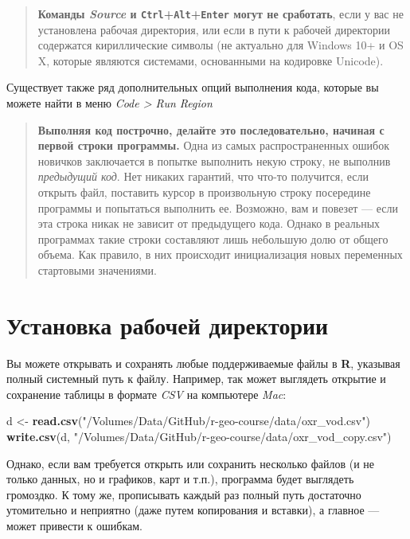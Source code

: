 \documentclass[]{book}
\newenvironment{Shaded}{\begin{snugshade}}{\end{snugshade}}
\newcommand{\KeywordTok}[1]{\textcolor[rgb]{0.13,0.29,0.53}{\textbf{#1}}}
\newcommand{\StringTok}[1]{\textcolor[rgb]{0.31,0.60,0.02}{#1}}
\newcommand{\NormalTok}[1]{#1}
\begin{document}
\begin{quote}
\textbf{Команды \emph{Source} и
\texttt{Ctrl}+\texttt{Alt}+\texttt{Enter} могут не сработать}, если у
вас не установлена рабочая директория, или если в пути к рабочей
директории содержатся кириллические символы (не актуально для Windows
10+ и OS X, которые являются системами, основанными на кодировке
Unicode).
\end{quote}

Существует также ряд дополнительных опций выполнения кода, которые вы
можете найти в меню \emph{Code \textgreater{} Run Region}

\begin{quote}
\textbf{Выполняя код построчно, делайте это последовательно, начиная с
первой строки программы.} Одна из самых распространенных ошибок новичков
заключается в попытке выполнить некую строку, не выполнив
\emph{предыдущий код}. Нет никаких гарантий, что что-то получится, если
открыть файл, поставить курсор в произвольную строку посередине
программы и попытаться выполнить ее. Возможно, вам и повезет --- если
эта строка никак не зависит от предыдущего кода. Однако в реальных
программах такие строки составляют лишь небольшую долю от общего объема.
Как правило, в них происходит инициализация новых переменных стартовыми
значениями.
\end{quote}

\section*{Установка рабочей директории}\label{--}

Вы можете открывать и сохранять любые поддерживаемые файлы в \textbf{R},
указывая полный системный путь к файлу. Например, так может выглядеть
открытие и сохранение таблицы в формате \emph{CSV} на компьютере
\emph{Mac}:

\begin{Shaded}
\begin{Highlighting}[]
\NormalTok{d <-}\StringTok{ }\KeywordTok{read.csv}\NormalTok{(}\StringTok{"/Volumes/Data/GitHub/r-geo-course/data/oxr_vod.csv"}\NormalTok{)}
\KeywordTok{write.csv}\NormalTok{(d, }\StringTok{"/Volumes/Data/GitHub/r-geo-course/data/oxr_vod_copy.csv"}\NormalTok{)}
\end{Highlighting}
\end{Shaded}

Однако, если вам требуется открыть или сохранить несколько файлов (и не
только данных, но и графиков, карт и т.п.), программа будет выглядеть
громоздко. К тому же, прописывать каждый раз полный путь достаточно
утомительно и неприятно (даже путем копирования и вставки), а главное
--- может привести к ошибкам.
\end{document}
